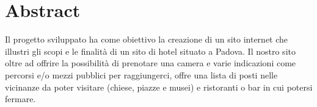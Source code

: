 \section{Abstract}
Il progetto sviluppato ha come obiettivo la creazione di un sito internet che illustri gli scopi e le finalità di un sito di hotel situato a Padova.
Il nostro sito oltre ad offrire la possibilità di prenotare una camera e varie indicazioni come percorsi e/o mezzi pubblici per raggiungerci, offre una lista
di posti nelle vicinanze da poter visitare (chiese, piazze e musei) e ristoranti o bar in cui potersi fermare.
